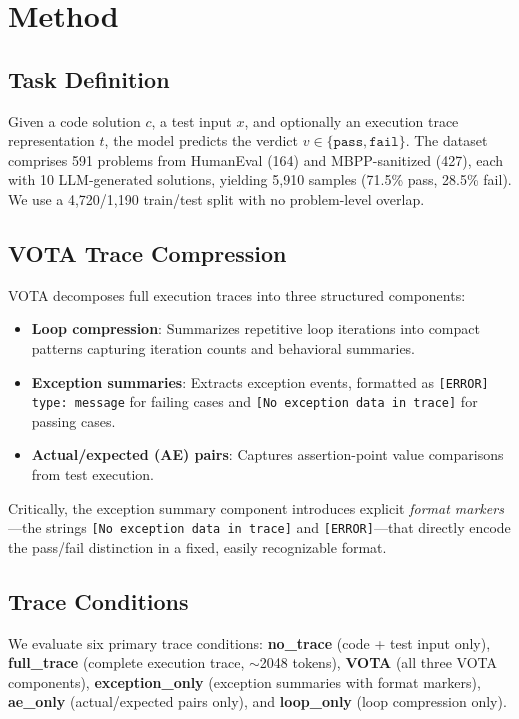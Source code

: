 \documentclass[11pt,a4paper]{article}
\begin{document}
\section{Method}
\label{sec:method}

\subsection{Task Definition}

Given a code solution $c$, a test input $x$, and optionally an execution trace representation $t$, the model predicts the verdict $v \in \{\texttt{pass}, \texttt{fail}\}$.
The dataset comprises 591 problems from HumanEval (164) and MBPP-sanitized (427), each with 10 LLM-generated solutions, yielding 5,910 samples (71.5\% pass, 28.5\% fail).
We use a 4,720/1,190 train/test split with no problem-level overlap.

\subsection{VOTA Trace Compression}

VOTA decomposes full execution traces into three structured components:

\begin{itemize}
    \item \textbf{Loop compression}: Summarizes repetitive loop iterations into compact patterns capturing iteration counts and behavioral summaries.
    \item \textbf{Exception summaries}: Extracts exception events, formatted as \texttt{[ERROR] type: message} for failing cases and \texttt{[No exception data in trace]} for passing cases.
    \item \textbf{Actual/expected (AE) pairs}: Captures assertion-point value comparisons from test execution.
\end{itemize}

Critically, the exception summary component introduces explicit \emph{format markers}---the strings \texttt{[No exception data in trace]} and \texttt{[ERROR]}---that directly encode the pass/fail distinction in a fixed, easily recognizable format.

\subsection{Trace Conditions}

We evaluate six primary trace conditions:
\textbf{no\_trace} (code + test input only),
\textbf{full\_trace} (complete execution trace, ${\sim}$2048 tokens),
\textbf{VOTA} (all three VOTA components),
\textbf{exception\_only} (exception summaries with format markers),
\textbf{ae\_only} (actual/expected pairs only),
and \textbf{loop\_only} (loop compression only).
\end{document}
